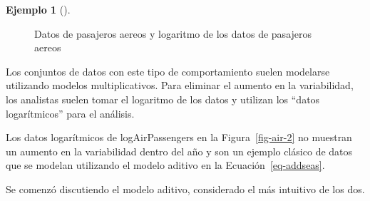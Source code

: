 \documentclass[
  us-letterpaper,
]{scrreprt}
\theoremstyle{plain}
\theoremstyle{definition}
\newtheorem{example}{Ejemplo}[chapter]
\theoremstyle{plain}
\theoremstyle{definition}
\theoremstyle{remark}
\begin{document}
\begin{example}[]
\begin{tcolorbox}
\begin{figure}[H]
\begin{minipage}{0.50\linewidth}
{}


\end{minipage}%
%
\begin{minipage}{0.50\linewidth}



\end{minipage}%

\caption{\label{fig-air}Datos de pasajeros aereos y logaritmo de los
datos de pasajeros aereos}

\end{figure}%

Los conjuntos de datos con este tipo de comportamiento suelen modelarse
utilizando modelos multiplicativos. Para eliminar el aumento en la
variabilidad, los analistas suelen tomar el logaritmo de los datos y
utilizan los ``datos logarítmicos'' para el análisis.

Los datos logarítmicos de logAirPassengers en la Figura~\ref{fig-air-2}
no muestran un aumento en la variabilidad dentro del año y son un
ejemplo clásico de datos que se modelan utilizando el modelo aditivo en
la Ecuación~\ref{eq-addseas}.

\end{tcolorbox}

\end{example}

Se comenzó discutiendo el modelo aditivo, considerado el más intuitivo
de los dos.
\end{document}
